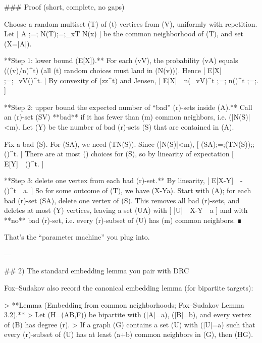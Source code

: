 ### Proof (short, complete, no gaps)

Choose a random multiset (T) of (t) vertices from (V), uniformly with repetition. Let
[
A ;=; N(T);=;\bigcap_{x\in T} N(x)
]
be the common neighborhood of (T), and set (X=|A|).

**Step 1: lower bound (\mathbb E[X]).**
For each (v\in V), the probability (v\in A) equals ((\deg(v)/n)^t) (all (t) random choices must land in (N(v))). Hence
[
\mathbb E[X] ;=;\sum_{v\in V}\left(\right)^t.
]
By convexity of (z\mapsto z^t) and Jensen,
[
\mathbb E[X]\ \ge\ n\left(\sum_{v\in V}\right)^t
;=; n\left(\right)^t
;=;.
]

**Step 2: upper bound the expected number of “bad” (r)-sets inside (A).**
Call an (r)-set (S\subseteq V) **bad** if it has fewer than (m) common neighbors, i.e. (|N(S)|<m).
Let (Y) be the number of bad (r)-sets (S) that are contained in (A).

Fix a bad (S). For (S\subseteq A), we need (T\subseteq N(S)). Since (|N(S)|<m),
[
\Pr(S\subseteq A);=;\Pr(T\subseteq N(S));\le;\left(\right)^t.
]
There are at most () choices for (S), so by linearity of expectation
[
\mathbb E[Y]\ \le\ \left(\right)^t.
]

**Step 3: delete one vertex from each bad (r)-set.**
By linearity,
[
\mathbb E[X-Y]\ \ge\ -\left(\right)^t\ \ge\ a.
]
So for some outcome of (T), we have (X-Y\ge a). Start with (A); for each bad (r)-set (S\subseteq A), delete one vertex of (S). This removes all bad (r)-sets, and deletes at most (Y) vertices, leaving a set (U\subseteq A) with
[
|U|\ \ge\ X-Y\ \ge\ a
]
and with **no** bad (r)-set, i.e. every (r)-subset of (U) has (\ge m) common neighbors. ∎

That’s the “parameter machine” you plug into.

---

## 2) The standard embedding lemma you pair with DRC

Fox–Sudakov also record the canonical embedding lemma (for bipartite targets):

> **Lemma (Embedding from common neighborhoods; Fox–Sudakov Lemma 3.2).**
> Let (H=(A\cup B,F)) be bipartite with (|A|=a), (|B|=b), and every vertex of (B) has degree (\le r).
> If a graph (G) contains a set (U) with (|U|=a) such that every (r)-subset of (U) has at least (a+b) common neighbors in (G), then (H\subseteq G).

